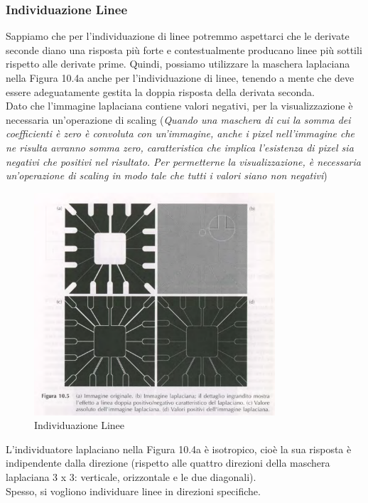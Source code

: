 \documentclass[12pt]{article}
\begin{document}
\subsubsection{Individuazione Linee}
Sappiamo che per l'individuazione di linee potremmo aspettarci che le derivate seconde diano una risposta più forte e contestualmente producano linee più sottili rispetto alle derivate prime. Quindi, possiamo utilizzare la maschera laplaciana nella Figura 10.4a anche per l'individuazione di linee, tenendo a mente che deve essere
adeguatamente gestita la doppia risposta della derivata seconda. \\
Dato che l'immagine laplaciana contiene valori negativi, per la visualizzazione è necessaria un'operazione
di scaling (\textit{Quando una maschera di cui la somma dei coefficienti è zero è convoluta con un'immagine,
    anche i pixel nell'immagine che ne risulta avranno somma zero, caratteristica che implica l'esistenza di pixel sia negativi che positivi nel risultato. Per permetterne la visualizzazione, è necessaria un'operazione di scaling in modo tale che tutti i valori siano non negativi})
\begin{figure}[!htb]
    \centering
    \includegraphics[width=0.8\textwidth]{Images/lapmodulo.png}
    \caption{Individuazione Linee}
\end{figure}
\FloatBarrier
L'individuatore laplaciano nella Figura 10.4a è isotropico, cioè la sua risposta è indipendente dalla direzione (rispetto alle quattro direzioni della maschera laplaciana 3 x 3: verticale, orizzontale e le due diagonali).\\Spesso, si vogliono individuare linee in direzioni specifiche.
\end{document}
